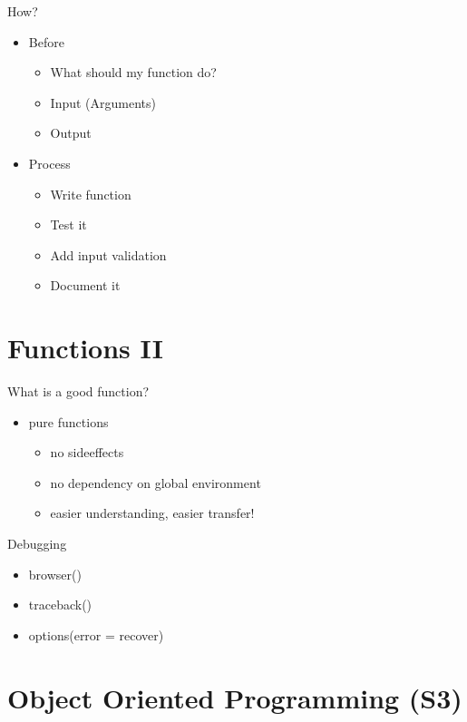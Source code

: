 \documentclass[xcolor=table]{beamer}\usepackage[]{graphicx}\usepackage[]{color}
\begin{document}
\begin{frame}{How?}
\begin{itemize}
  \item Before
  \begin{itemize}
    \item What should my function do?
    \item Input (Arguments)
    \item Output
  \end{itemize}
  \item Process
  \begin{itemize}
    \item Write function
    \item Test it
    \item Add input validation
    \item Document it
  \end{itemize}
\end{itemize}
\end{frame}

\section{Functions II}

\begin{frame}{What is a good function?}
\begin{itemize}
  \item pure functions
  \begin{itemize}
    \item no sideeffects
    \item no dependency on global environment
    \item easier understanding, easier transfer!
  \end{itemize}
\end{itemize}
\end{frame}

\begin{frame}{Debugging}
\begin{itemize}
  \item browser()
  \item traceback()
  \item options(error = recover)
\end{itemize}
\end{frame}

\section{Object Oriented Programming (S3)}
\end{document}
